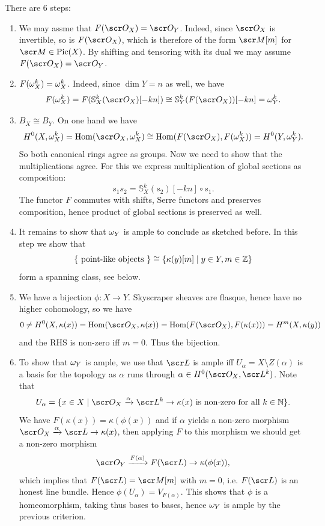 \documentclass[A4paper, british]{amsart}
\theoremstyle{darkgreentheorem}
\theoremstyle{darkbluedefinition}
\theoremstyle{darkredexample}
\theoremstyle{remark}
\DeclareMathOperator{\Hom}{Hom}
\DeclareMathOperator{\Pic}{Pic}
\renewcommand{\S}{\mathbb{S}}
\newcommand{\1}{\mathbbm{1}}
\begin{document}
There are 6 steps:
\begin{enumerate}
    \item We may assme that $F(\O_{X})=\O_{Y}$.
	Indeed, since $\O_{X}$ is invertible, so is $F(\O_{X})$, which is therefore of the form $\M[m]$ for $\M\in \Pic(X)$.
	By shifting and tensoring with its dual we may assume $F(\O_{X})=\O_{Y}$.
    \item $F(\omega_{X}^{k})=\omega_{X}^{k}$.
	Indeed, since $\dim{Y}=n$ as well, we have
	\[ F(\w_{X}^{k})=F(\S_{X}^{k}(\O_{X})[-kn])\cong \S_{Y}^{k}(F(\O_{X}))[-kn]=\w_{Y}^{k}. \]
    \item $B_{X}\cong B_{Y}$.
	On one hand we have
	\[ H^{0}(X,\w_{X}^{k})=\Hom(\O_{X},\w_{X}^{k})\cong \Hom(F(\O_{X}),F(\w_{X}^{k}))=H^{0}(Y,\w_{Y}^{k}). \]
	So both canonical rings agree as groups.
	Now we need to show that the multiplications agree.
	For this we express multiplication of global sections as composition:
	\[ s_{1}s_{2}=\S_{X}^{k}(s_{2})[-kn]\circ s_{1}. \]
	The functor $F$ commutes with shifts, Serre functors and preserves composition, hence product of global sections is preserved as well.
    \item It remains to show that $\omega_{Y}$ is ample to conclude as sketched before.
	In this step we show that
	\[ \{ \text{ point-like objects }\}\cong \{ \kappa(y)[m]\mid y\in Y,m\in \mathbb{Z}\} \]
	form a spanning class, see below.
    \item We have a bijection $\phi\colon X\to Y$.
	Skyscraper sheaves are flasque, hence have no higher cohomology, so we have
	\[ 0\neq H^{0}(X,\kappa(x))=\Hom(\O_{X},\kappa(x))=\Hom(F(\O_{X}),F(\kappa(x)))=H^{m}(X,\kappa(y)) \]
	and the RHS is non-zero iff $m=0$.
	Thus the bijection.
    \item To show that $\omega_{Y}$ is ample, we use that $\L$ is ample iff $U_{\alpha}=X\setminus Z(\alpha)$ is a basis for the topology as $\alpha$ runs through $\alpha\in H^{0}(\O_{X},\L^{k})$.
	Note that
	\[ U_{\alpha}=\{x\in X\mid \O_{X}\xrightarrow{\alpha}\L^{k}\to \kappa(x) \text{ is non-zero for all }k\in \N  \}. \]
	We have $F(\kappa(x))=\kappa(\phi(x))$ and if $\alpha$ yields a non-zero morphism $\O_{X}\xrightarrow{\alpha} \L\to \kappa(x)$, then applying $F$ to this morphism we should get a non-zero morphism
	\[ \O_{Y}\xrightarrow{F(\alpha)}F(\L)\to \kappa(\phi(x)), \]
	which implies that $F(\L)=\M[m]$ with $m=0$, i.e. $F(\L)$ is an honest line bundle.
	Hence $\phi(U_{\alpha})=V_{F(\alpha)}$.
	This shows that $\phi$ is a homeomorphism, taking thus bases to bases, hence $\omega_{Y}$ is ample by the previous criterion.
\end{enumerate}
\end{document}
